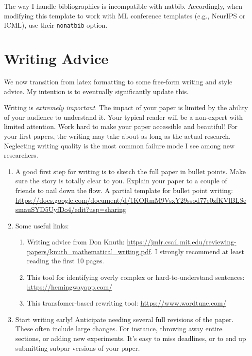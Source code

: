 \documentclass{article}
\begin{document}
The way I handle bibliographies is incompatible with natbib. Accordingly, when modifying this template to work with ML conference templates (e.g., NeurIPS or ICML), use their \texttt{nonatbib} option.

\section{Writing Advice}
We now transition from latex formatting to some free-form writing and style advice.
My intention is to eventually significantly update this.

Writing is \emph{extremely important}. The impact of your paper is limited by the ability of your audience to understand it. Your typical reader will be a non-expert with limited attention. Work hard to make your paper accessible and beautiful! For your first papers, the writing may take about as long as the actual research. Neglecting writing quality is the most common failure mode I see among new researchers. 
\begin{enumerate}
  \item A good first step for writing is to sketch the full paper in bullet points. Make sure the story is totally clear to you. Explain your paper to a couple of friends to nail down the flow. A partial template for bullet point writing: \url{https://docs.google.com/document/d/1KORmM9VsxY29ssod77e0zfKVlBLSesmauSYD5UyfDo4/edit?usp=sharing}
  \item Some useful links:
    \begin{enumerate}
    \item Writing advice from Don Knuth: \url{https://jmlr.csail.mit.edu/reviewing-papers/knuth_mathematical_writing.pdf}. I strongly recommend at least reading the first 10 pages.
    \item This tool for identifying overly complex or hard-to-understand sentences: \url{https://hemingwayapp.com/}
    \item This transfomer-based rewriting tool: \url{https://www.wordtune.com/}
    \end{enumerate}
  \item Start writing early! Anticipate needing several full revisions of the paper. These often include large changes. For instance, throwing away entire sections, or adding new experiments. It's easy to miss deadlines, or to end up submitting subpar versions of your paper.   
\end{enumerate}


\printbibliography
\end{document}
